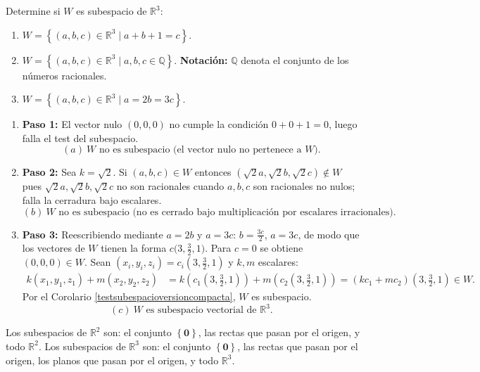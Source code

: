 \begin{example}
Determine si $W$ es subespacio de $\mathbb{R}^3$:
\begin{enumerate}[$(a)$]
\item $W=\left\lbrace (a,b,c)\in \mathbb{R}^3 \mid a+b+1=c   \right\rbrace.$
\item $W=\left\lbrace (a,b,c)\in \mathbb{R}^3 \mid a, b, c \in \mathbb{Q}  \right\rbrace.$ \textbf{Notación:}  $\mathbb{Q}$ denota el conjunto de los números racionales.
\item $W=\left\lbrace (a,b,c)\in \mathbb{R}^3 \mid a=2b=3c  \right\rbrace.$
\end{enumerate}
\begin{myproof}
\begin{enumerate}[$(a)$]
\item \textbf{Paso 1:} El vector nulo $(0,0,0)$ no cumple la condición $0+0+1=0$, luego falla el test del subespacio.
$$\boxed{(a)\ W \text{ no es subespacio (el vector nulo no pertenece a } W\text{).}}$$

\item \textbf{Paso 2:} Sea $k=\sqrt{2}$. Si $(a,b,c)\in W$ entonces $(\sqrt{2}a,\sqrt{2}b,\sqrt{2}c) \notin W$ pues $\sqrt{2}a, \sqrt{2}b, \sqrt{2}c$ no son racionales cuando $a, b, c$ son racionales no nulos; falla la cerradura bajo escalares.
$$\boxed{(b)\ W \text{ no es subespacio (no es cerrado bajo multiplicación por escalares irracionales).}}$$

\item \textbf{Paso 3:} Reescribiendo mediante $a=2b$ y $a=3c$: $b=\frac{3c}{2}$, $a=3c$, de modo que los vectores de $W$ tienen la forma $c\bigl(3, \frac{3}{2}, 1\bigr)$. Para $c=0$ se obtiene $(0,0,0)\in W$. Sean $(x_i,y_i,z_i)=c_i(3,\frac{3}{2},1)$ y $k,m$ escalares:
\begin{align*}
k(x_1,y_1,z_1)+m(x_2,y_2,z_2)&=k\left(c_1(3,\tfrac{3}{2},1)\right)+m\left(c_2(3,\tfrac{3}{2},1)\right)=(kc_1+mc_2)(3,\tfrac{3}{2},1)\in W.
\end{align*}
Por el Corolario \ref{testsubespacioversioncompacta}, $W$ es subespacio.
$$\boxed{(c)\ W \text{ es subespacio vectorial de } \mathbb{R}^3.}$$
\end{enumerate}
\end{myproof}
\end{example}

\begin{rem}
Los subespacios de $\mathbb{R}^2$ son: el conjunto $\left\lbrace \mathbf{0} \right\rbrace$, las rectas que pasan por el origen, y todo $\mathbb{R}^2$. Los subespacios de $\mathbb{R}^3$ son: el conjunto $\left\lbrace \mathbf{0} \right\rbrace$, las rectas que pasan por el origen, los planos que pasan por el origen, y todo $\mathbb{R}^3$.
\end{rem}

